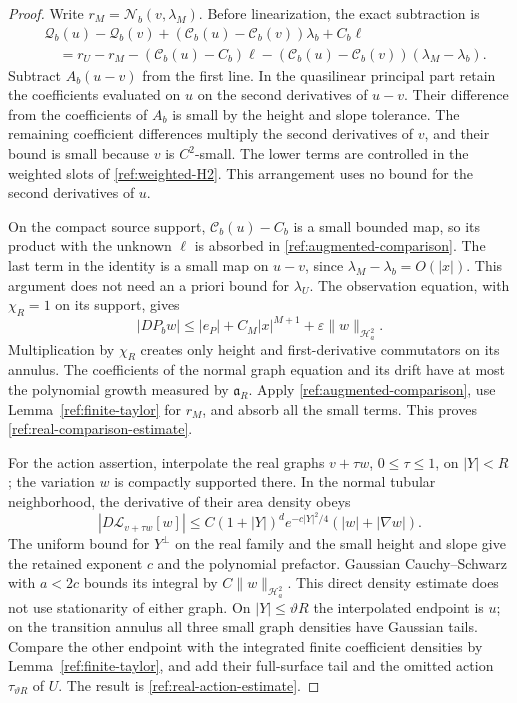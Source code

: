 \begin{proof}
Write $r_M=\mathcal N_b(v,\lambda_M)$.  Before linearization, the exact
subtraction is
\begin{align*}
&\mathcal Q_b(u)-\mathcal Q_b(v)
 +(\mathcal C_b(u)-\mathcal C_b(v))\lambda_b+C_b\ell\\
&\quad=r_U-r_M-(\mathcal C_b(u)-C_b)\ell
 -(\mathcal C_b(u)-\mathcal C_b(v))(\lambda_M-\lambda_b).
\end{align*}
Subtract $A_b(u-v)$ from the first line.  In the quasilinear principal
part retain the coefficients evaluated on $u$ on the second derivatives
of $u-v$.  Their difference from the coefficients of $A_b$ is small
by the height and slope tolerance.  The remaining coefficient differences
multiply the second derivatives of $v$, and their bound is small because
$v$ is $C^2$-small.  The lower terms are controlled in the weighted
slots of \eqref{ref:weighted-H2}.  This arrangement uses no bound for
the second derivatives of $u$.

On the compact source support, $\mathcal C_b(u)-C_b$ is a small bounded
map, so its product with the unknown $\ell$ is absorbed in
\eqref{ref:augmented-comparison}.  The last term in the identity is a
small map on $u-v$, since $\lambda_M-\lambda_b=O(|x|)$.  This argument
does not need an a priori bound for $\lambda_U$.  The observation
equation, with $\chi_R=1$ on its support, gives
\[
 |DP_bw|\le |e_P|+C_M|x|^{M+1}
                 +\varepsilon\|w\|_{\mathcal H^2_a}.
\]
Multiplication by $\chi_R$ creates only height and first-derivative
commutators on its annulus.  The coefficients of the normal graph
equation and its drift have at most the polynomial growth measured by
$\mathfrak a_R$.  Apply \eqref{ref:augmented-comparison}, use
Lemma~\ref{ref:finite-taylor} for $r_M$, and absorb all the small terms.
This proves \eqref{ref:real-comparison-estimate}.

For the action assertion, interpolate the real graphs $v+\tau w$,
$0\le\tau\le1$, on $|Y|<R$; the variation $w$ is compactly supported there.
In the normal tubular
neighborhood, the derivative of their area density obeys
\[
 |D\mathcal L_{v+\tau w}[w]|
 \le C(1+|Y|)^d e^{-c|Y|^2/4}
                         (|w|+|\nabla w|).
\]
The uniform bound for $Y^\perp$ on the real family and the small height
and slope give the retained exponent $c$ and the polynomial prefactor.
Gaussian Cauchy--Schwarz with $a<2c$ bounds its integral by
$C\|w\|_{\mathcal H^2_a}$.  This direct density estimate does not use
stationarity of either graph.  On $|Y|\le\vartheta R$ the interpolated endpoint
is $u$; on the transition annulus all three small graph densities have
Gaussian tails.  Compare the other endpoint with the integrated finite
coefficient densities by Lemma~\ref{ref:finite-taylor}, and add their
full-surface tail and the omitted action $\tau_{\vartheta R}$ of $U$.  The result is
\eqref{ref:real-action-estimate}.
\end{proof}
